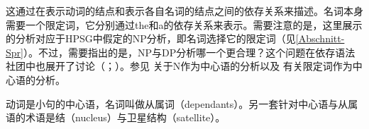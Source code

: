 这通过在表示动词的结点和表示各自名词的结点之间的依存关系来描述。名词本身需要一个限定词，它分别通过the和a的依存关系来表示。需要注意的是，这里展示的分析对应于HPSG中假定的NP分析，即名词选择它的限定词（见\ref{Abschnitt-Spr}）。不过，需要指出的是，NP与DP分析哪一个更合理？这个问题在依存语法社团中也展开了讨论（\citealp[]{Hudson84a-u}；\citealp{vanLangendonck94a,Hudson2004a}）。参见 \citet{Engel77}关于N作为中心语的分析以及 \citet[]{Welke2011a-u}有关限定词作为中心语的分析。

动词是小句的中心语，名词叫做从属词（dependants）。另一套针对中心语与从属语的术语是结（nucleus）与卫星结构（satellite）。

